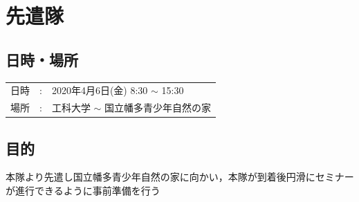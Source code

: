 %
\section{先遣隊}

\subsection{日時・場所}

\begin{tabular}{p{}rp{}}
  日時 & : & 2020年4月6日(金) 8:30 $\sim$ 15:30\\
  場所 & : & 工科大学 $\sim$ 国立幡多青少年自然の家
\end{tabular}

\subsection{目的}
本隊より先遣し国立幡多青少年自然の家に向かい，本隊が到着後円滑にセミナーが進行できるように事前準備を行う

